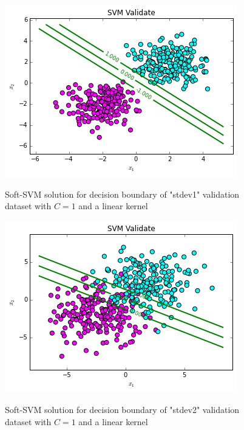 \documentclass[10pt]{article}
\begin{document}
\begin{figure}
\centering
\includegraphics[scale=0.5]{svm_stdev1_val.png}
\label{svm_toy}
\caption{Soft-SVM solution for decision boundary of "stdev1" validation dataset with $C=1$ and a linear kernel}
\end{figure}
\begin{figure}
\centering
\includegraphics[scale=0.5]{svm_stdev2_val.png}
\label{svm_toy}
\caption{Soft-SVM solution for decision boundary of "stdev2" validation dataset with $C=1$ and a linear kernel}
\end{figure}
\end{document}
